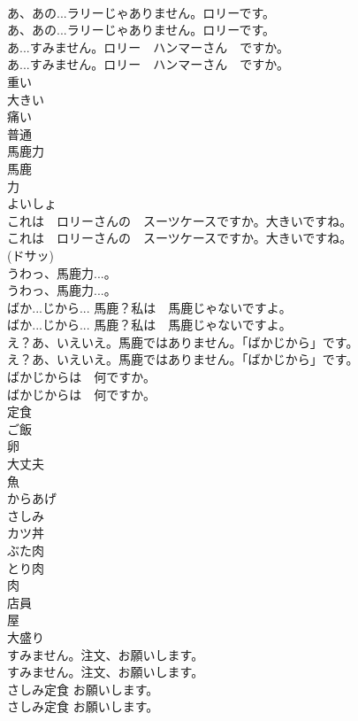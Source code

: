 \documentclass[8pt]{extreport}
\begin{document}
\begin{CJK}{UTF8}{min}
\\	あ、あの...ラリーじゃありません。ロリーです。	
\\	あ、あの...ラリーじゃありません。ロリーです。 
\\	あ...すみません。ロリー　ハンマーさん　ですか。	
\\	あ...すみません。ロリー　ハンマーさん　ですか。 
\\	重い
\\	大きい
\\	痛い
\\	普通
\\	馬鹿力
\\	馬鹿
\\	力
\\	よいしょ
\\	これは　ロリーさんの　スーツケースですか。大きいですね。	
\\	これは　ロリーさんの　スーツケースですか。大きいですね。 
\\	(ドサッ)	
\\	うわっ、馬鹿力...。	
\\	うわっ、馬鹿力...。 
\\	ばか...じから... 馬鹿？私は　馬鹿じゃないですよ。	
\\	ばか...じから... 馬鹿？私は　馬鹿じゃないですよ。 
\\	え？あ、いえいえ。馬鹿ではありません。「ばかじから」です。	
\\	え？あ、いえいえ。馬鹿ではありません。「ばかじから」です。 
\\	ばかじからは　何ですか。	
\\	ばかじからは　何ですか。 
\\	定食
\\	ご飯
\\	卵
\\	大丈夫
\\	魚
\\	からあげ
\\	さしみ
\\	カツ丼
\\	ぶた肉
\\	とり肉
\\	肉
\\	店員
\\	屋
\\	大盛り
\\	すみません。注文、お願いします。	
\\	すみません。注文、お願いします。 
\\	さしみ定食 お願いします。	
\\	さしみ定食 お願いします。 

\end{CJK}
\end{document}
